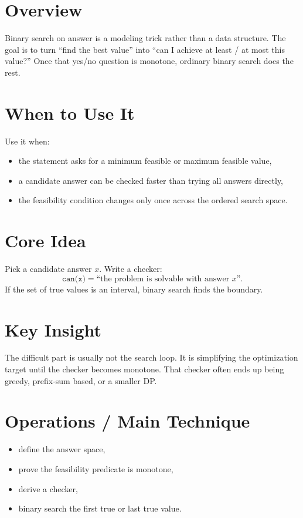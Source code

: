 \section*{Overview}

Binary search on answer is a modeling trick rather than a data structure. The goal is to turn ``find the best value''
into ``can I achieve at least / at most this value?'' Once that yes/no question is monotone, ordinary binary search
does the rest.

\section*{When to Use It}

Use it when:

\begin{itemize}
  \item the statement asks for a minimum feasible or maximum feasible value,
  \item a candidate answer can be checked faster than trying all answers directly,
  \item the feasibility condition changes only once across the ordered search space.
\end{itemize}

\section*{Core Idea}

Pick a candidate answer \(x\). Write a checker:
\[
\texttt{can(x)} = \text{``the problem is solvable with answer } x \text{''}.
\]
If the set of true values is an interval, binary search finds the boundary.

\section*{Key Insight}

The difficult part is usually not the search loop. It is simplifying the optimization target until the checker becomes
monotone. That checker often ends up being greedy, prefix-sum based, or a smaller DP.

\section*{Operations / Main Technique}

\begin{itemize}
  \item define the answer space,
  \item prove the feasibility predicate is monotone,
  \item derive a checker,
  \item binary search the first true or last true value.
\end{itemize}

